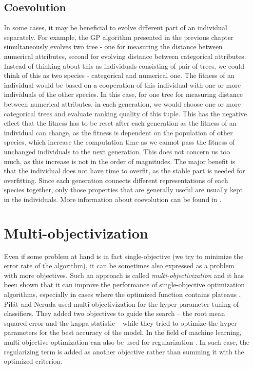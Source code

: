 \subsection{Coevolution}
In some cases, it may be beneficial to evolve different part of an individual separately.
For example, the GP algorithm presented in the previous chapter simultaneously evolves two tree - one for measuring the distance between numerical attributes, second for evolving distance between categorical attributes. Instead of thinking about this as individuals consisting of pair of trees, we could think of this as two species - categorical and numerical one. The fitness of an individual would be based on a cooperation of this individual with one or more individuals of the other species. In this case, for one tree for measuring distance between numerical attributes, in each generation, we would choose one or more categorical trees and evaluate ranking quality of this tuple. This has the negative effect that the fitness has to be reset after each generation as the fitness of an individual can change, as the fitness is dependent on the population of other species, which increase the computation time as we cannot pass the fitness of unchanged individuals to the next generation. This does not concern us too much, as this increase is not in the order of magnitudes. The major benefit is that the individual does not have time to overfit, as the stable part is needed for overfitting. Since each generation connects different representations of each species together, only those properties that are generally useful are usually kept in the individuals. More information about coevolution can be found in \cite{WeigandCooperativeCoevolutionaryAlgorithmsAnalysis,PotterJongEvolvingComplexStructuresCoevolution, PotterArchitectureforEvolvingCoadaptedSubcomponents, PotterComputationalModelofCooperativeCoevolution}.

\section{Multi-objectivization}
\label{section:multiobjectivization}
Even if some problem at hand is in fact single-objective (we try to minimize
the error rate of the algorithm), it can be sometimes also expressed as a problem with more
objectives. Such an approach is called \emph{multi-objectivization} and it has
been shown that it can improve the performance of single-objective optimization algorithms,
especially in cases where the optimized function contains plateaus
\cite{BrockhoffAO}. Pil\'at and Neruda \cite{pilat2013multi} used
multi-objectivization for the hyper-parameter tuning of classifiers. They
added two objectives to guide the search -- the root mean squared error and the
kappa statistic -- while they tried to optimize the hyper-parameters for the best
accuracy of the model. In the field of machine learning, multi-objective
optimization can also be used for regularization \cite{multiML}. In such case,
the regularizing term is added as another objective rather than summing it with
the optimized criterion.

